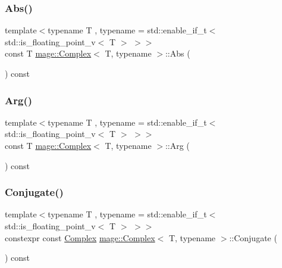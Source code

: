 \subsubsection{\texorpdfstring{Abs()}{Abs()}}
{\footnotesize\ttfamily template$<$typename T , typename  = std\+::enable\+\_\+if\+\_\+t$<$ std\+::is\+\_\+floating\+\_\+point\+\_\+v$<$ T $>$ $>$$>$ \\
const T \mbox{\hyperlink{structmage_1_1_complex}{mage\+::\+Complex}}$<$ T, typename $>$\+::Abs (\begin{DoxyParamCaption}{ }\end{DoxyParamCaption}) const\hspace{0.3cm}{\ttfamily [noexcept]}}

\mbox{\label{structmage_1_1_complex_a76cf1d92879578518d2b00c8bdf1b3e0}} 
\subsubsection{\texorpdfstring{Arg()}{Arg()}}
{\footnotesize\ttfamily template$<$typename T , typename  = std\+::enable\+\_\+if\+\_\+t$<$ std\+::is\+\_\+floating\+\_\+point\+\_\+v$<$ T $>$ $>$$>$ \\
const T \mbox{\hyperlink{structmage_1_1_complex}{mage\+::\+Complex}}$<$ T, typename $>$\+::Arg (\begin{DoxyParamCaption}{ }\end{DoxyParamCaption}) const\hspace{0.3cm}{\ttfamily [noexcept]}}

\mbox{\label{structmage_1_1_complex_a1190d128e494e5feec6c60a5c268cbd8}} 
\subsubsection{\texorpdfstring{Conjugate()}{Conjugate()}}
{\footnotesize\ttfamily template$<$typename T , typename  = std\+::enable\+\_\+if\+\_\+t$<$ std\+::is\+\_\+floating\+\_\+point\+\_\+v$<$ T $>$ $>$$>$ \\
constexpr const \mbox{\hyperlink{structmage_1_1_complex}{Complex}} \mbox{\hyperlink{structmage_1_1_complex}{mage\+::\+Complex}}$<$ T, typename $>$\+::Conjugate (\begin{DoxyParamCaption}{ }\end{DoxyParamCaption}) const\hspace{0.3cm}{\ttfamily [noexcept]}}

